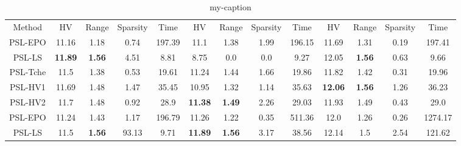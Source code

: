 \begin{table}[]
\centering
\caption{my-caption}
\label{my-label}
\begin{tabular}{ccccccccccccc}
Method  &        HV            &              Range        &             Sparsity&        Time  &      HV            &              Range        &             Sparsity&        Time  &      HV            &              Range        &             Sparsity&        Time\\
PSL-EPO &        11.16         &              1.18         &             0.74    &        197.39&      11.1          &              1.38         &             1.99    &        196.15&      11.69         &              1.31         &             0.19    &        197.41\\
PSL-LS  &        \textbf{11.89}&              \textbf{1.56}&             4.51    &        8.81  &      8.75          &              0.0          &             0.0     &        9.27  &      12.05         &              \textbf{1.56}&             0.63    &        9.66\\
PSL-Tche&        11.5          &              1.38         &             0.53    &        19.61 &      11.24         &              1.44         &             1.66    &        19.86 &      11.82         &              1.42         &             0.31    &        19.96\\
PSL-HV1 &        11.69         &              1.48         &             1.47    &        35.45 &      10.95         &              1.32         &             1.14    &        35.63 &      \textbf{12.06}&              \textbf{1.56}&             1.26    &        36.23\\
PSL-HV2 &        11.7          &              1.48         &             0.92    &        28.9  &      \textbf{11.38}&              \textbf{1.49}&             2.26    &        29.03 &      11.93         &              1.49         &             0.43    &        29.0\\
PSL-EPO &        11.24         &              1.43         &             1.17    &        196.79&      11.26         &              1.22         &             0.35    &        511.36&      12.0          &              1.26         &             0.26    &        1274.17\\
PSL-LS  &        11.5          &              \textbf{1.56}&             93.13   &        9.71  &      \textbf{11.89}&              \textbf{1.56}&             3.17    &        38.56 &      12.14         &              1.5          &             2.54    &        121.62\\

\end{tabular}
\end{table}
